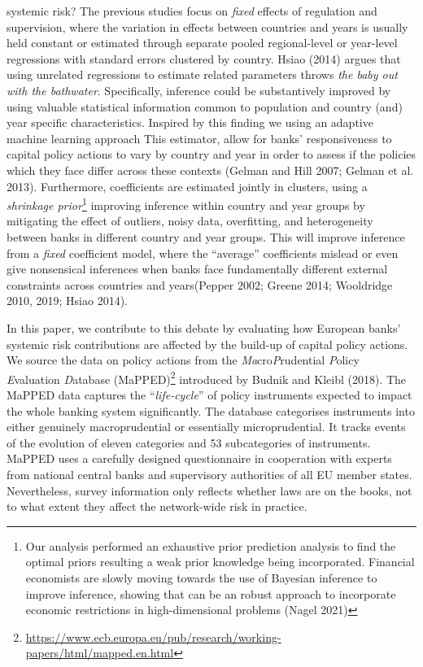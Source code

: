 \documentclass[
  10pt,
]{article}
\begin{document}
systemic risk? The previous studies focus on \emph{fixed} effects of
regulation and supervision, where the variation in effects between
countries and years is usually held constant or estimated through
separate pooled regional-level or year-level regressions with standard
errors clustered by country. Hsiao (2014) argues that using unrelated
regressions to estimate related parameters throws \emph{the baby out
with the bathwater}. Specifically, inference could be substantively
improved by using valuable statistical information common to population
and country (and) year specific characteristics. Inspired by this
finding we using an adaptive machine learning approach This estimator,
allow for banks' responsiveness to capital policy actions to vary by
country and year in order to assess if the policies which they face
differ across these contexts (Gelman and Hill 2007; Gelman et al. 2013).
Furthermore, coefficients are estimated jointly in clusters, using a
\emph{shrinkage prior}\footnote{Our analysis performed an exhaustive
  prior prediction analysis to find the optimal priors resulting a weak
  prior knowledge being incorporated. Financial economists are slowly
  moving towards the use of Bayesian inference to improve inference,
  showing that can be an robust approach to incorporate economic
  restrictions in high-dimensional problems (Nagel 2021)} improving
inference within country and year groups by mitigating the effect of
outliers, noisy data, overfitting, and heterogeneity between banks in
different country and year groups. This will improve inference from a
\emph{fixed} coefficient model, where the ``average'' coefficients
mislead or even give nonsensical inferences when banks face
fundamentally different external constraints across countries and
years(Pepper 2002; Greene 2014; Wooldridge 2010, 2019; Hsiao 2014).

In this paper, we contribute to this debate by evaluating how European
banks' systemic risk contributions are affected by the build-up of
capital policy actions. We source the data on policy actions from the
\emph{Ma}cro\emph{P}rudential \emph{P}olicy \emph{E}valuation
\emph{D}atabase (MaPPED)\footnote{\url{https://www.ecb.europa.eu/pub/research/working-papers/html/mapped.en.html}}
introduced by Budnik and Kleibl (2018). The MaPPED data captures the
``\emph{life-cycle}'' of policy instruments expected to impact the whole
banking system significantly. The database categorises instruments into
either genuinely macroprudential or essentially microprudential. It
tracks events of the evolution of eleven categories and 53 subcategories
of instruments. MaPPED uses a carefully designed questionnaire in
cooperation with experts from national central banks and supervisory
authorities of all EU member states. Nevertheless, survey information
only reflects whether laws are on the books, not to what extent they
affect the network-wide risk in practice.
\end{document}
